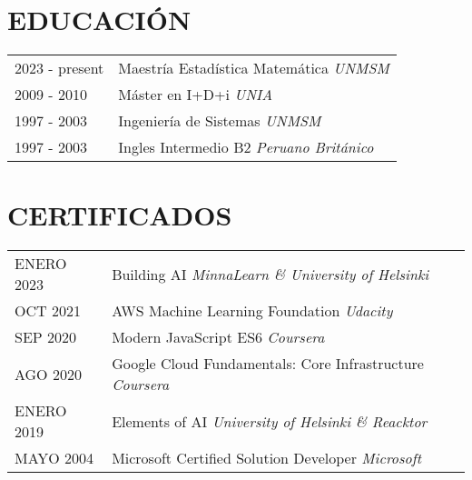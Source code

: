 \documentclass[a4paper,12pt]{article}
\begin{document}
\section{EDUCACIÓN}
\begin{tabularx}{\linewidth}{@{}l X@{}}	
2023 - present & Maestría Estadística Matemática \hfill \textsl{UNMSM} \\

2009 - 2010 & Máster en I+D+i \hfill \textsl{UNIA} \\ 

1997 - 2003 & Ingeniería de Sistemas \hfill \textsl{UNMSM} \\

1997 - 2003 & Ingles Intermedio B2 \hfill \textsl{Peruano Británico} \\
\end{tabularx}


\section{CERTIFICADOS}

\begin{tabularx}{\linewidth}{@{}l X@{}}	
ENERO 2023 & Building AI \hfill \textsl{MinnaLearn \& University of Helsinki} \\

OCT 2021 & AWS Machine Learning Foundation \hfill \textsl{Udacity} \\ 

SEP 2020 & Modern JavaScript ES6  \hfill \textsl{Coursera} \\

AGO 2020 & Google Cloud Fundamentals: Core Infrastructure  \hfill \textsl{Coursera} \\

ENERO 2019 & Elements of AI  \hfill \textsl{University of Helsinki \& Reacktor} \\

MAYO 2004 & Microsoft Certified Solution Developer  \hfill \textsl{Microsoft} \\

\end{tabularx}

\end{document}
